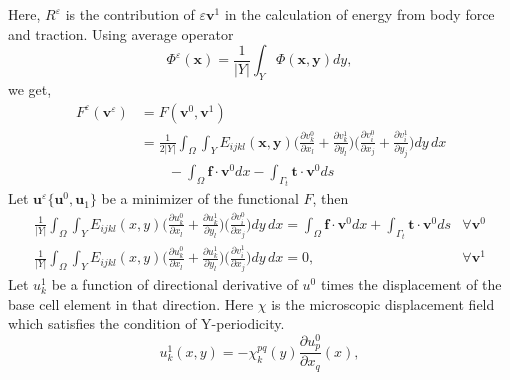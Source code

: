 \documentclass[openright,twoside]{iitkthesis}
\newcommand{\e}[1]{\textbf{#1}}
\begin{document}
Here, $R^\varepsilon$ is the contribution of $\varepsilon\textbf{v}^1$ in the calculation of energy from body force and traction.
Using average operator 
\begin{equation}
\Phi^\varepsilon(\e x) = \frac{1}{|Y|}\int_Y \Phi(\e x,\e y)dy,
\end{equation}
we get,
\begin{equation}
\begin{split}
\,F^\varepsilon(\textbf{v}^\varepsilon)&=F(\textbf{v}^0,\textbf{v}^1)\\
&=\frac{1}{2|Y|}\int_\Omega\int_Y E_{ijkl}(\e x,\e y) \bigg (\frac{\partial v_{k}^0}{\partial x_l}+\frac{\partial v_{k}^1}{\partial y_l}\bigg )\bigg (\frac{\partial v_{i}^0}{\partial x_j}+\frac{\partial v_{i}^1}{\partial y_j}\bigg )dy\,dx\\
&\qquad-\int_\Omega\textbf{f}\cdot\textbf{v}^0 dx - \int_{\Gamma_t}\textbf{t}\cdot\textbf{v}^0 ds 
\end{split}
\end{equation}
Let $\e u^\varepsilon\{\textbf{u}^0, \textbf{u}_1\}$ be a minimizer of the functional $F$, then 
\begin{eqnarray}
\label{eq:functional1}
\frac{1}{|Y|}\int_\Omega\int_Y E_{ijkl}(x,y)\bigg (\frac{\partial u_{k}^0}{\partial x_l}+\frac{\partial u_{k}^1}{\partial y_l}\bigg )\bigg (\frac{\partial v_{i}^0}{\partial x_j}\bigg ) dy\,dx = \int_\Omega\textbf{f}\cdot\textbf{v}^0 dx + \int_{\Gamma_t}\textbf{t}\cdot\textbf{v}^0 ds &\forall \textbf{v}^0\\
\label{eq:functional2}
\frac{1}{|Y|}\int_\Omega\int_Y E_{ijkl}(x,y)\bigg (\frac{\partial u_{k}^0}{\partial x_l}+\frac{\partial u_{k}^1}{\partial y_l}\bigg )\bigg (\frac{\partial v_{i}^1}{\partial x_j}\bigg ) dy\,dx = 0,  &\forall \textbf{v}^1
\end{eqnarray}
Let $u_{k}^1$ be a function of directional derivative of $u^0$ times the displacement of the base cell element in that direction. Here $\chi$ is the microscopic displacement field which satisfies the condition of Y-periodicity.
\begin{equation}\label{localization}
u_{k}^1(x,y)=-\chi^{pq}_k(y)\frac{\partial u_{p}^0}{\partial x_q}(x),
\end{equation}
\end{document}
